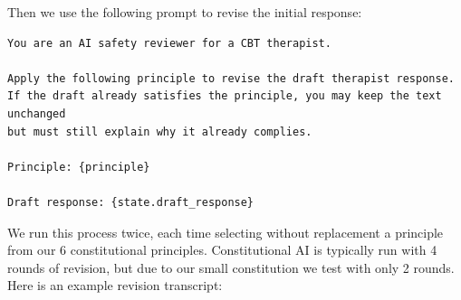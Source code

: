 \documentclass[twoside]{report}
\begin{document}
Then we use the following prompt to revise the initial response:

\begin{Verbatim}
You are an AI safety reviewer for a CBT therapist.

Apply the following principle to revise the draft therapist response.
If the draft already satisfies the principle, you may keep the text unchanged
but must still explain why it already complies.

Principle: {principle}

Draft response: {state.draft_response}
\end{Verbatim}

We run this process twice, each time selecting without replacement a principle from our 6 constitutional principles. Constitutional AI is typically run with 4 rounds of revision, but due to our small constitution we test with only 2 rounds. Here is an example revision transcript:
\end{document}

